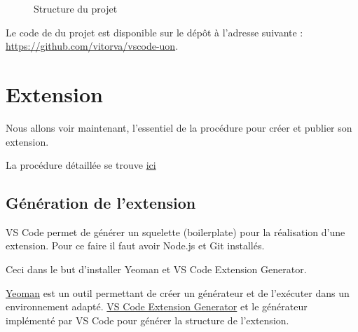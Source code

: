 \documentclass[
    iict, %
    il, %
]{heig-tb}
\begin{document}
\begin{figure}[!h]
    \centering
    \caption{Structure du projet}
    \label{project-structure}
\end{figure}

Le code de du projet est disponible sur le dépôt à l'adresse suivante : \url{https://github.com/vitorva/vscode-uon}.

\section{Extension}
Nous allons voir maintenant, l'essentiel de la procédure pour créer et publier son extension.

La procédure détaillée se trouve \href{https://code.visualstudio.com/api/get-started/your-first-extension
}{ici}

\subsection{Génération de l'extension}

VS Code permet de générer un squelette (boilerplate) pour la réalisation d'une extension.
Pour ce faire il faut avoir Node.js et Git installés.

Ceci dans le but d'installer Yeoman et VS Code Extension Generator.

\href{https://yeoman.io/}{Yeoman} est un outil permettant de créer un générateur et de l'exécuter dans un environnement adapté.
\href{https://www.npmjs.com/package/generator-code}{VS Code Extension Generator} et le générateur implémenté par VS Code pour générer la structure de l'extension.
\end{document}
